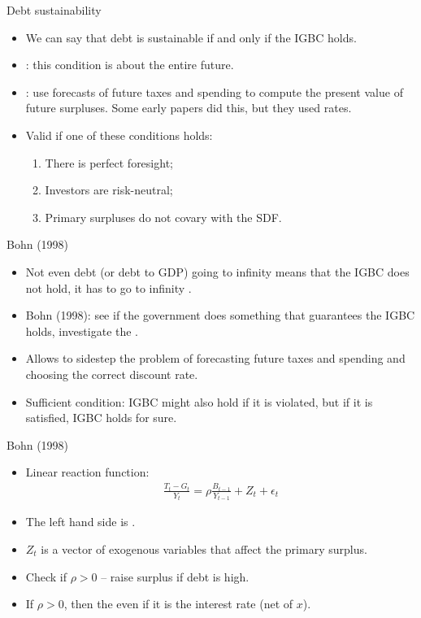 \documentclass[11pt,xcolor={dvipsnames},aspectratio=159,hyperref={pdftex,pdfpagemode=UseNone,hidelinks,pdfdisplaydoctitle=true},usepdftitle=false]{beamer}
\begin{document}
\begin{frame}{Debt sustainability}
    \begin{itemize}
        \item We can say that debt is sustainable if and only if the IGBC holds.
        \item {}: this condition is about the entire future. 
        \item {}: use forecasts of future taxes and spending to compute the present value of future surpluses. Some early papers did this, but they used  rates.  
        \item Valid if one of these conditions holds: 
        \begin{enumerate}
            \item There is perfect foresight;
            \item Investors are risk-neutral;
            \item Primary surpluses do not covary with the SDF.
        \end{enumerate}
    \end{itemize}
\end{frame}


\begin{frame}{Bohn (1998)}
    \begin{itemize}
        \item Not even debt (or debt to GDP) going to infinity means that the IGBC does not hold, it has to go to infinity .
        \item Bohn (1998): see if the government does something that guarantees the IGBC holds, investigate the .
        \item Allows to sidestep the problem of forecasting future taxes and spending and choosing the correct discount rate.
        \item Sufficient condition: IGBC might also hold if it is violated, but if it is satisfied, IGBC holds for sure.
    \end{itemize}
\end{frame}

\begin{frame}{Bohn (1998)}
    \begin{itemize}
        \item Linear reaction function:
        \begin{align*}
            \frac{T_t - G_t}{Y_t} = \rho \frac{B_{t-1}}{Y_{t-1}} + Z_t + \epsilon_t
        \end{align*}
        \item The left hand side is .
        \item $Z_t$ is a vector of exogenous variables that affect the primary surplus.
        \item Check if $\rho>0$ -- raise surplus if debt is high. 
        \item If $\rho>0$, then the  even if it is  the interest rate (net of $x$).
    \end{itemize}
\end{frame}
\end{document}
